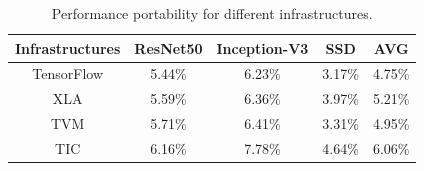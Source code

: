 
\begin{table}[b]
  \centering
  \scriptsize
  \vspace{-20pt}
\caption{\footnotesize Performance portability for different infrastructures.}
  \label{tab:port}
  \begin{tabular}{ccccc}
    \toprule
Infrastructures & ResNet50 & Inception-V3 & SSD  & AVG\\
    \midrule
TensorFlow & 5.44\% & 6.23\% & 3.17\% &4.75\% \\
    \midrule
XLA & 5.59\% & 6.36\% & 3.97\% & 5.21\% \\
    \midrule
TVM & 5.71\% & 6.41\% & 3.31\% & 4.95\% \\
    \midrule
TIC & 6.16\% & 7.78\% & 4.64\% & 6.06\% \\
    \bottomrule
  \end{tabular}
\end{table}



